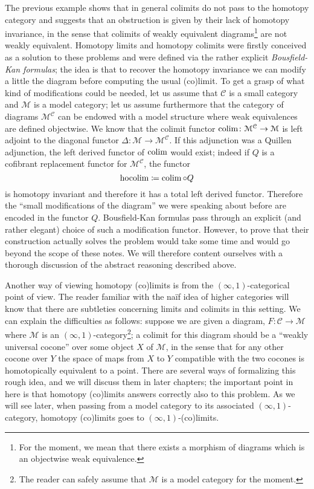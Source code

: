 \begin{refsection}
The previous example shows that in general colimits do not pass to the homotopy category and suggests that an obstruction is given by their lack of homotopy invariance, in the sense that colimits of weakly equivalent diagrams\footnote{For the moment, we mean that there exists a morphism of diagrams which is an objectwise weak equivalence.} are not weakly equivalent. Homotopy limits and homotopy colimits were firstly conceived as a solution to these problems and were defined via the rather explicit \emph{Bousfield-Kan formulas}; the idea is that to recover the homotopy invariance we can modify a little the diagram before computing the usual (co)limit. To get a grasp of what kind of modifications could be needed, let us assume that $\mathcal C$ is a small category and $\mathcal M$ is a model category; let us assume furthermore that the category of diagrams $\mathcal M^{\mathcal C}$ can be endowed with a model structure where weak equivalences are defined objectwise. We know that the colimit functor $\operatorname*{colim} \colon \mathcal M^{\mathcal C} \to \mathcal M$ is left adjoint to the diagonal functor $\Delta \colon \mathcal M \to \mathcal M^{\mathcal C}$. If this adjunction was a Quillen adjunction, the left derived functor of $\operatorname*{colim}$ would exist; indeed if $Q$ is a cofibrant replacement functor for $\mathcal M^{\mathcal C}$, the functor
\[
\mathrm{hocolim} \coloneqq \operatorname*{colim} \circ Q
\]
is homotopy invariant and therefore it has a total left derived functor. Therefore the ``small modifications of the diagram'' we were speaking about before are encoded in the functor $Q$. Bousfield-Kan formulas pass through an explicit (and rather elegant) choice of such a modification functor. However, to prove that their construction actually solves the problem would take some time and would go beyond the scope of these notes. We will therefore content ourselves with a thorough discussion of the abstract reasoning described above.

Another way of viewing homotopy (co)limits is from the $(\infty,1)$-categorical point of view. The reader familiar with the na\"if idea of higher categories will know that there are subtleties concerning limits and colimits in this setting. We can explain the difficulties as follows: suppose we are given a diagram, $F \colon \mathcal C \to \mathcal M$ where $\mathcal M$ is an $(\infty,1)$-category\footnote{The reader can safely assume that $\mathcal M$ is a model category for the moment.}; a colimit for this diagram should be a ``weakly universal cocone'' over some object $X$ of $\mathcal M$, in the sense that for any other cocone over $Y$ the space of maps from $X$ to $Y$ compatible with the two cocones is homotopically equivalent to a point. There are several ways of formalizing this rough idea, and we will discuss them in later chapters; the important point in here is that homotopy (co)limits answers correctly also to this problem. As we will see later, when passing from a model category to its associated $(\infty,1)$-category, homotopy (co)limits goes to $(\infty,1)$-(co)limits.


\end{refsection}

